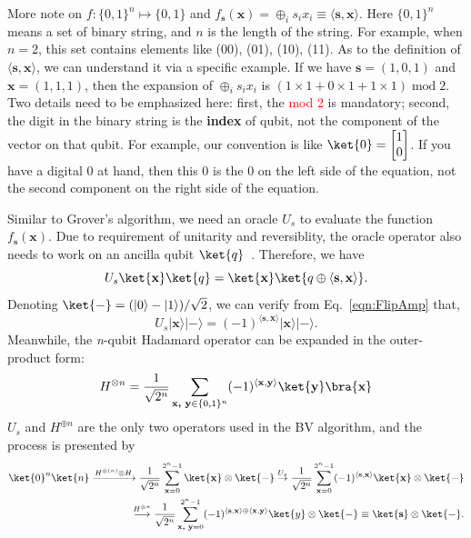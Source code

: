 More note on $f:\{0,1\}^n\mapsto\{0,1\}$ and $f_\textbf{s}(\textbf{x})=\oplus_is_i x_i\equiv\langle\textbf{s},\textbf{x}\rangle$. Here $\{0,1\}^n$ means a set of binary string, and $n$ is the length of the string. For example, when $n=2$, this set contains elements like {(00), (01), (10), (11)}. As to the definition of $\langle\textbf{s},\textbf{x}\rangle$, we can understand it via a specific example. If we have $\textbf{s}=(1, 0, 1)$ and $\textbf{x}=(1, 1, 1)$, then the expansion of $\oplus_is_i x_i$ is $(1\times1+0\times1+1\times1) \; \text{mod}\; 2$. Two details need to be emphasized here: first, the \textcolor{red}{mod 2} is mandatory; second, the digit in the binary string is the \textbf{index} of qubit, not the component of the vector on that qubit. For example, our convention is like $\ket{0}=\begin{bmatrix}
    1\\0
\end{bmatrix}$. If you have a digital 0 at hand, then this 0 is the 0 on the left side of the equation, not the second component on the right side of the equation. 

Similar to Grover's algorithm, we need an oracle $U_s$ to evaluate the function $f_\textbf{s}(\textbf{x})$. Due to requirement of unitarity and reversiblity, the oracle operator also needs to work on an ancilla qubit $\ket{q}$~\cite{RobertLoredo2020}. Therefore, we have 
\begin{equation}
    U_s\ket{\textbf{x}}\ket{q}=\ket{\textbf{x}}\ket{q\oplus\langle\textbf{s},\textbf{x}\rangle}.
\end{equation}
Denoting $\ket{-}=(|0\rangle-|1\rangle)/\sqrt{2}$, we can verify from Eq.~\ref{eqn:FlipAmp} that,
\begin{equation}
    U_s|\textbf{x}\rangle|-\rangle=(-1)^{\langle\textbf{s},\textbf{x}\rangle}|\textbf{x}\rangle|-\rangle.
\end{equation}
Meanwhile, the \textit{n}-qubit Hadamard operator can be expanded in the outer-product form:
\begin{equation}
    H^{\otimes n}=\frac{1}{\sqrt{2^n}}\sum_{\textbf{x, y}\in\{0,1\}^n}(-1)^{\langle\textbf{x},\textbf{y}\rangle}\ket{\textbf{y}}\bra{\textbf{x}}
    \label{eqn:NqubitHadamard}
\end{equation}
$U_s$ and $H^{\oplus n}$ are the only two operators used in the BV algorithm, and the process is presented by
\begin{equation}
    \begin{split}
    \ket{0}^n\ket{n}\xrightarrow{H^{\otimes (n)}\otimes H} \frac{1}{\sqrt{2^n}}\sum_{\textbf{x}=0}^{2^n-1}\ket{\textbf{x}}\otimes\ket{-}\overset{U_s}{\rightarrow}\frac{1}{\sqrt{2^n}}\sum_{\textbf{x}=0}^{2^n-1}(-1)^{\langle\textbf{s},\textbf{x}\rangle}\ket{\textbf{x}}\otimes\ket{-}\\ 
    \overset{H^{\otimes n}}{\longrightarrow}\frac{1}{\sqrt{2^n}}\sum_{\textbf{x, y}=0}^{2^n-1}(-1)^{\langle\textbf{s},\textbf{x}\rangle\oplus\langle\textbf{x},\textbf{y}\rangle}\ket{y}\otimes\ket{-}\equiv\ket{\textbf{s}}\otimes\ket{-}.
    \end{split}
\end{equation}
